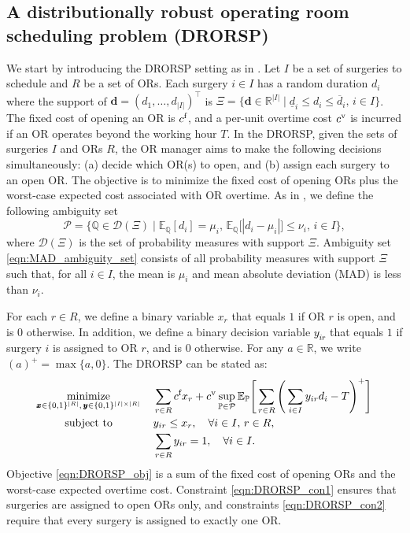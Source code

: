 \documentclass[preprint,review,11pt]{elsarticle}
\theoremstyle{definition}
\theoremstyle{remark}
\newcommand{\tp}{\top}
\newcommand{\E}{\mathbb{E}}
\newcommand{\Prob}{\mathbb{P}}
\newcommand{\Q}{\mathbb{Q}}
\newcommand{\R}{\mathbb{R}}
\newcommand{\calD}{\mathcal{D}}
\newcommand{\calP}{\mathcal{P}}
\newcommand{\xb}{\pmb{x}}
\newcommand{\yb}{\pmb{y}}
\newcommand{\db}{\pmb{d}}
\newcommand{\cf}{c^{\tiny{\textup{f}}}}
\newcommand{\cv}{c^{\tiny{\textup{v}}}}
\newcommand{\dlb}{\underline{d}}
\newcommand{\dub}{\overline{d}}
\newcommand{\blue}{\textcolor{black}}
\begin{document}
\subsection{A distributionally robust operating room scheduling problem (DRORSP)} \label{subsec:DRO_OR_scehduling}
We start by introducing the DRORSP setting as in \cite{Wang_et_al:2019}. Let $I$ be a set of surgeries to schedule and $R$ be a set of ORs. Each surgery $i\in I$ has a random duration $d_i$ where the support of $\db=(d_1,\dots,d_{|I|})^\tp$ is $\Xi=\{\db\in\R^{|I|}\mid \dlb_i\leq d_i\leq\dub_i,\,i\in I\}$. The fixed cost of opening an OR is $\cf$, and a per-unit overtime cost $\cv$ is incurred if an OR operates beyond the working hour $T$. In the DRORSP, given the sets of surgeries $I$ and ORs $R$, the OR manager aims to make the following decisions simultaneously:  (a) decide which OR(s) to open, and (b) assign each surgery to an open OR. The objective is to minimize the fixed cost of opening ORs plus the worst-case expected cost associated with OR overtime. As in \cite{Wang_et_al:2019}, we define the following ambiguity set
%
\begin{equation} \label{eqn:MAD_ambiguity_set}
   \calP=\big\{\Q\in\calD(\Xi)\mid \E_\Q[d_i]=\mu_i,\, \E_\Q\big[|d_i-\mu_i|\big] \leq \nu_i,\, i\in I\big\},
\end{equation} 
%
where $\calD(\Xi)$ is the set of probability measures with support $\Xi$. Ambiguity set \eqref{eqn:MAD_ambiguity_set} consists of all probability measures with support $\Xi$ such that, for all $i \in I$, the mean is $\mu_i$ and mean absolute deviation (MAD) is less than $\nu_i$.

For each $r\in R$, we define a binary variable $x_{r}$ that equals $1$ if OR $r$ is open, and is $0$ otherwise. In addition, we define a binary decision variable \blue{$y_{ir}$} that equals $1$ if surgery $i$ is assigned to OR $r$, and is $0$ otherwise. For any $a\in\R$, we write $(a)^+=\max\{a,0\}$. The DRORSP can be stated as:
%
\begin{subequations}
\begin{align}
\underset{\xb\in\{0,1\}^{|R|},\,\yb\in\{0,1\}^{|I|\times|R|}}{\text{minimize}}\, \quad
&  \sum_{r\in R} \cf x_r + \cv \sup_{\Prob\in\calP} \E_\Prob\Bigg[\sum_{r\in R} \Bigg(\sum_{i\in I} y_{ir}d_i - T \Bigg)^+ \Bigg] \label{eqn:DRORSP_obj}\\
\text{subject to} \hspace{9.5mm} \quad
& y_{ir} \leq x_r,\quad\forall i\in I,\, r\in R,  \label{eqn:DRORSP_con1}\\
& \sum_{r\in R}y_{ir} = 1,\quad\forall i\in I.  \label{eqn:DRORSP_con2}
\end{align} \label{prob:DRORSP}%
\end{subequations}
%
Objective \eqref{eqn:DRORSP_obj} is a sum of the fixed cost of opening ORs and the worst-case expected overtime cost. Constraint \eqref{eqn:DRORSP_con1} ensures that surgeries are assigned to open ORs only, and constraints \eqref{eqn:DRORSP_con2} require that every surgery is assigned to exactly one OR. 
\end{document}
